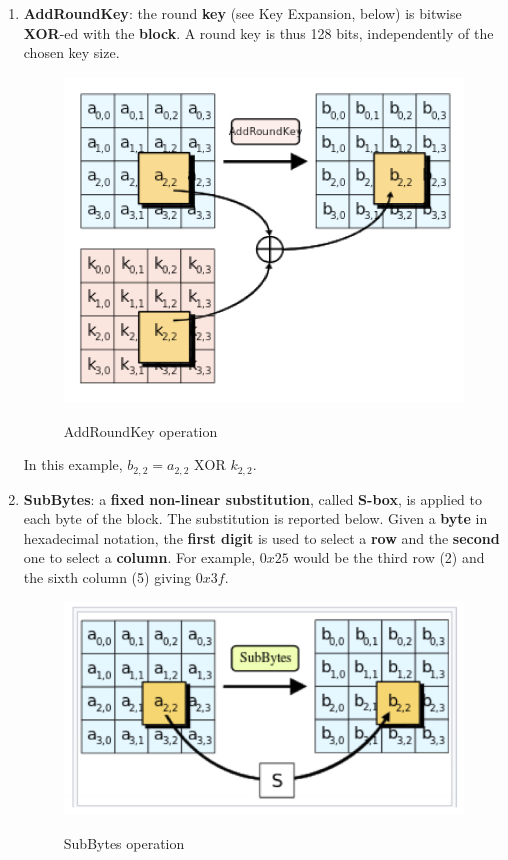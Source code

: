 \begin{enumerate}
    \item \textbf{AddRoundKey}: the round \textbf{key} (see Key Expansion, below) is bitwise \textbf{XOR}-ed with the \textbf{block}. A round key is thus 128 bits, independently of the chosen key size.

    \begin{figure}[h!]
        \centering
        \includegraphics[scale = 0.8]{img/aes2.png}
        \label{aes2}
        \caption{AddRoundKey operation}
    \end{figure}

    In this example, $b_{2,2} = a_{2,2} \text{ XOR } k_{2,2}$.
    
    \item \textbf{SubBytes}: a \textbf{fixed }\textbf{non-linear substitution}, called \textbf{S-box}, is applied to each byte of the block. The substitution is reported below. Given a \textbf{byte} in hexadecimal notation, the \textbf{first digit} is used to select a \textbf{row} and the \textbf{second} one to select a \textbf{column}. For example, $0x25$ would be the third row (2) and the sixth column (5) giving $0x3f$.

    \begin{figure}[h!]
        \centering
        \includegraphics[scale = 0.65]{img/aes3.png}
        \label{aes2}
        \caption{SubBytes operation}
    \end{figure}


\end{enumerate}
